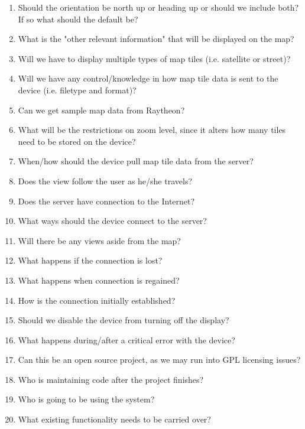 \documentclass{article}
\begin{document}
\begin{enumerate}[label*=3.\arabic*]
\item Should the orientation be north up or heading up or should we include both? If so what should the default be?
\item What is the "other relevant information" that will be displayed on the map?
\item Will we have to display multiple types of map tiles (i.e. satellite or street)?
\item Will we have any control/knowledge in how map tile data is sent to the device (i.e. filetype and format)?
\item Can we get sample map data from Raytheon?
\item What will be the restrictions on zoom level, since it alters how many tiles need to be stored on the device?
\item When/how should the device pull map tile data from the server?
\item Does the view follow the user as he/she travels?
\item Does the server have connection to the Internet?
\item What ways should the device connect to the server?
\item Will there be any views aside from the map?
\item What happens if the connection is lost?
\item What happens when connection is regained?
\item How is the connection initially established?
\item Should we disable the device from turning off the display?
\item What happens during/after a critical error with the device?
\item Can this be an open source project, as we may run into GPL licensing issues?
\item Who is maintaining code after the project finishes?
\item Who is going to be using the system?
\item What existing functionality needs to be carried over?
\end{enumerate}
\end{document}
